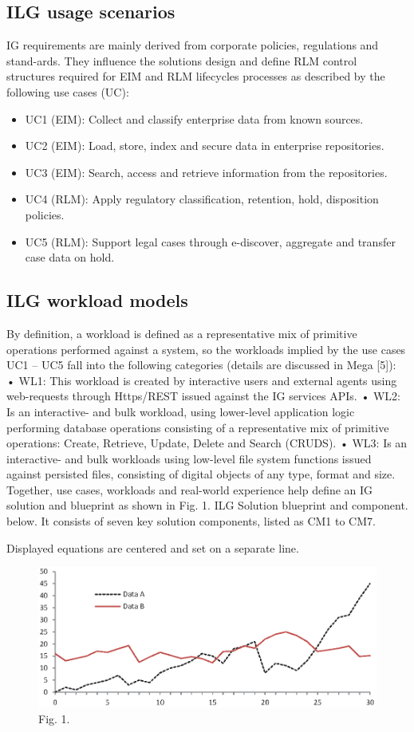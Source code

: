 \documentclass[runningheads]{llncs}
\begin{document}
\subsection{ILG usage scenarios}
IG requirements are mainly derived from corporate policies, regulations and stand-ards. They influence the solutions design and define RLM control structures required for EIM and RLM lifecycles processes as described by the following use cases (UC):
\begin{itemize}

\item {UC1 (EIM): Collect and classify enterprise data from known sources.}
\item {UC2 (EIM): Load, store, index and secure data in enterprise repositories.}
\item {UC3 (EIM): Search, access and retrieve information from the repositories.}
\item {UC4 (RLM): Apply regulatory classification, retention, hold, disposition policies.}
\item {UC5 (RLM): Support legal cases through e-discover, aggregate and transfer case data on hold.}
\end{itemize}

\subsection{ILG workload models}
By definition, a workload is defined as a representative mix of primitive operations performed against a system, so the workloads implied by the use cases UC1 – UC5 fall into the following categories (details are discussed in Mega [5]): 
•	WL1: This workload is created by interactive users and external agents using web-requests through Https/REST issued against the IG services APIs.
•	WL2: Is an interactive- and bulk workload, using lower-level application logic performing database operations consisting of a representative mix of primitive operations: Create, Retrieve, Update, Delete and Search (CRUDS).
•	WL3: Is an interactive- and bulk workloads using low-level file system functions issued against persisted files, consisting of digital objects of any type, format and size. 
Together, use cases, workloads and real-world experience help define an IG solution and blueprint as shown in Fig. 1. ILG Solution blueprint and component. below. It consists of seven key solution components, listed as CM1 to CM7.

\noindent Displayed equations are centered and set on a separate line.
\begin{figure}
\includegraphics[width=\textwidth]{fig1.eps}
\caption{Fig. 1.} \label{fig1}
\end{figure}
\end{document}
